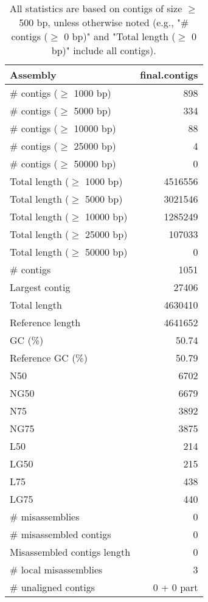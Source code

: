 \documentclass[12pt,a4paper]{article}
\begin{document}
\begin{table}[ht]
\begin{center}
\caption{All statistics are based on contigs of size $\geq$ 500 bp, unless otherwise noted (e.g., "\# contigs ($\geq$ 0 bp)" and "Total length ($\geq$ 0 bp)" include all contigs).}
\begin{tabular}{|l*{1}{|r}|}
\hline
Assembly & final.contigs \\ \hline
\# contigs ($\geq$ 1000 bp) & 898 \\ \hline
\# contigs ($\geq$ 5000 bp) & 334 \\ \hline
\# contigs ($\geq$ 10000 bp) & 88 \\ \hline
\# contigs ($\geq$ 25000 bp) & 4 \\ \hline
\# contigs ($\geq$ 50000 bp) & 0 \\ \hline
Total length ($\geq$ 1000 bp) & 4516556 \\ \hline
Total length ($\geq$ 5000 bp) & 3021546 \\ \hline
Total length ($\geq$ 10000 bp) & 1285249 \\ \hline
Total length ($\geq$ 25000 bp) & 107033 \\ \hline
Total length ($\geq$ 50000 bp) & 0 \\ \hline
\# contigs & 1051 \\ \hline
Largest contig & 27406 \\ \hline
Total length & 4630410 \\ \hline
Reference length & 4641652 \\ \hline
GC (\%) & 50.74 \\ \hline
Reference GC (\%) & 50.79 \\ \hline
N50 & 6702 \\ \hline
NG50 & 6679 \\ \hline
N75 & 3892 \\ \hline
NG75 & 3875 \\ \hline
L50 & 214 \\ \hline
LG50 & 215 \\ \hline
L75 & 438 \\ \hline
LG75 & 440 \\ \hline
\# misassemblies & 0 \\ \hline
\# misassembled contigs & 0 \\ \hline
Misassembled contigs length & 0 \\ \hline
\# local misassemblies & 3 \\ \hline
\# unaligned contigs & 0 + 0 part \\ \hline

\end{tabular}
\end{center}
\end{table}
\end{document}
